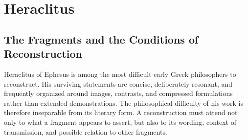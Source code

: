 %
%
%
%
%

\section{Heraclitus}
\label{sec:ch08-heraclitus}



\subsection{The Fragments and the Conditions of Reconstruction}

\label{para:VS.B01.P01.C08.S03.SS01.P001}

Heraclitus of Ephesus is among the most difficult early Greek
philosophers to reconstruct. His surviving statements are concise,
deliberately resonant, and frequently organized around images,
contrasts, and compressed formulations rather than extended
demonstrations. The philosophical difficulty of his work is
therefore inseparable from its literary form. A reconstruction
must attend not only to what a fragment appears to assert, but
also to its wording, context of transmission, and possible
relation to other fragments.

